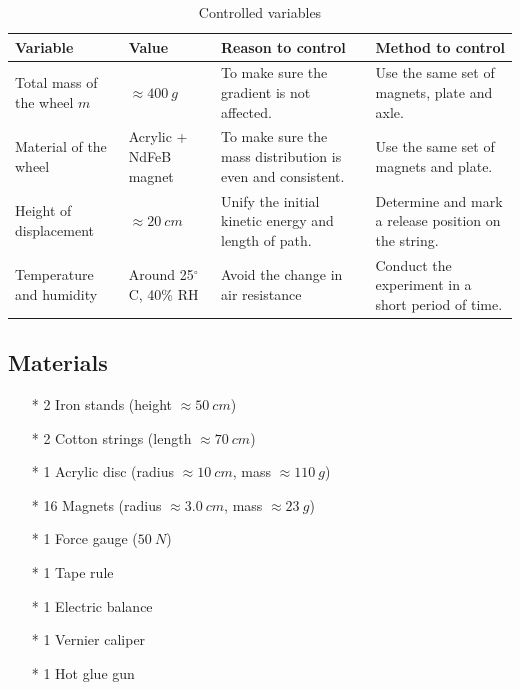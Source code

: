 \documentclass[a4paper]{article}
\begin{document}

\begin{table}[ht!]
\centering
\caption{Controlled variables}
\label{tab.control}
\begin{tabular}{llll}
\hline
Variable                    & Value                  & Reason to control                                          & Method to control                                    \\ \hline
Total mass of the wheel $m$ & $\approx \SI{400}{g}$  & To make sure the gradient is not affected.                 & Use the same set of magnets, plate and axle.         \\
Material of the wheel       & Acrylic + NdFeB magnet & To make sure the mass distribution is even and consistent. & Use the same set of magnets and plate.               \\
Height of displacement      & $\approx \SI{20}{cm}$  & Unify the initial kinetic energy and length of path.       & Determine and mark a release position on the string. \\ 
Temperature and humidity    & Around 25$^\circ$C, 40\% RH  & Avoid the change in air resistance                   & Conduct the experiment in a short period of time.    \\\hline
\end{tabular}
\end{table}

\subsection{Materials}

\begin{itemize}
    \item[*] 2 Iron stands (height $\approx \SI{50}{cm}$)
    \item[*] 2 Cotton strings (length $\approx \SI{70}{cm}$)
    \item[*] 1 Acrylic disc (radius $\approx \SI{10}{cm}$, mass $\approx \SI{110}{g}$)
    \item[*] 16 Magnets (radius $\approx \SI{3.0}{cm}$, mass $\approx \SI{23}{g}$)
    \item[*] 1 Force gauge ($\SI{50}{N}$)
    \item[*] 1 Tape rule
    \item[*] 1 Electric balance
    \item[*] 1 Vernier caliper
    \item[*] 1 Hot glue gun  
\end{itemize}
\end{document}
